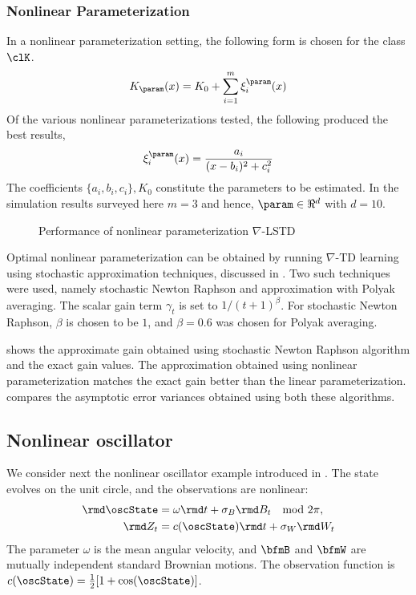 \subsubsection*{Nonlinear Parameterization}
\label{sec_nl_param}
In a nonlinear parameterization setting, the following form is chosen for the class $\clK$.
\begin{equation*}
K_\param(x) = K_{0} + \sum_{i=1}^m \xi_{i}^{\param}(x)
\end{equation*}
Of the various nonlinear parameterizations tested, the following produced the best results,
\begin{equation*}
\xi_{i}^{\param}(x) = \dfrac{a_{i}}{(x -b_{i})^2 + c_{i}^2}
\end{equation*}
The coefficients $\{a_{i}, b_{i}, c_{i} \}, K_{0}$ constitute the parameters to be estimated.
In the simulation results surveyed here  $m=3$ and hence, $\param \in \Re^{d}$ with $d=10$.
\begin{figure}[h]
	\caption{Performance of nonlinear parameterization $\nabla$-LSTD}
	\label{f:nltd}
\end{figure}

Optimal nonlinear parameterization can be obtained by running $\nabla$-TD learning using stochastic approximation techniques, discussed in . Two such techniques were used, namely stochastic Newton Raphson and approximation with Polyak averaging\cite{bor08a}. The scalar gain term $\gamma_t$ is set to $1/(t+1)^{\beta}$. For stochastic Newton Raphson, $\beta$ is chosen to be $1$, and $\beta=0.6$ was chosen for Polyak averaging.

 shows the approximate gain obtained using stochastic Newton Raphson algorithm and the  exact gain values. The approximation obtained using nonlinear parameterization matches the exact gain better than the linear parameterization.  compares the asymptotic error variances obtained using both these algorithms.

\subsection{Nonlinear oscillator}
\label{section_nl_oscillator}

We consider next the nonlinear oscillator example introduced in \cite{yanmehmey13}.
The state evolves on the unit circle, and the observations are nonlinear:
\begin{equation*}
\begin{aligned}
\rmd \oscState &= \omega \rmd t+\sigma_{B}\rmd B_t \quad \text{mod }2\pi,
\\
\rmd Z_t &= c(\oscState)\rmd t+ \sigma_{W} \rmd  W_t
\end{aligned}
\end{equation*}
The parameter $\omega$ is  the
mean angular velocity,  and $\bfmB$ and $\bfmW$ are mutually independent standard Brownian motions.
The observation function is
$c(\oscState)=\frac{1}{2}[1+\cos(\oscState)]$.

